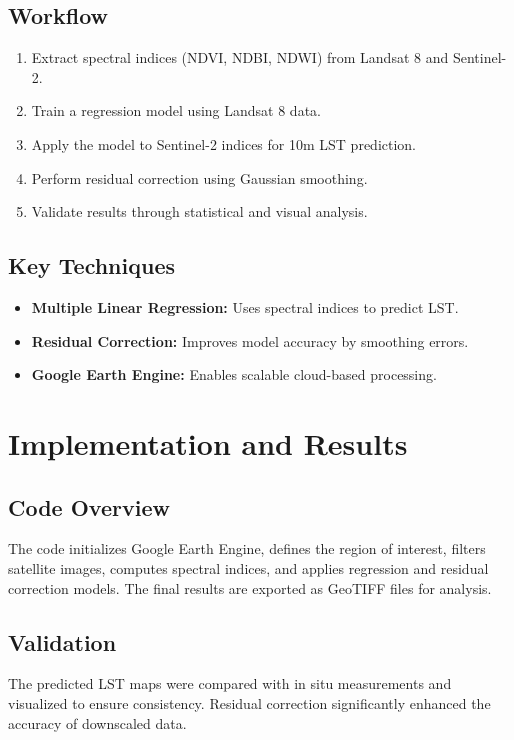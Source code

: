 \documentclass[runningheads,a4paper,11pt]{report}
\begin{document}
\section{Workflow}
\begin{enumerate}
    \item Extract spectral indices (NDVI, NDBI, NDWI) from Landsat 8 and Sentinel-2.
    \item Train a regression model using Landsat 8 data.
    \item Apply the model to Sentinel-2 indices for 10m LST prediction.
    \item Perform residual correction using Gaussian smoothing.
    \item Validate results through statistical and visual analysis.
\end{enumerate}

\section{Key Techniques}
\begin{itemize}
    \item \textbf{Multiple Linear Regression:} Uses spectral indices to predict LST.
    \item \textbf{Residual Correction:} Improves model accuracy by smoothing errors.
    \item \textbf{Google Earth Engine:} Enables scalable cloud-based processing.
\end{itemize}

\chapter{Implementation and Results}
\section{Code Overview}
The code initializes Google Earth Engine, defines the region of interest, filters satellite images, computes spectral indices, and applies regression and residual correction models. The final results are exported as GeoTIFF files for analysis.

\section{Validation}
The predicted LST maps were compared with in situ measurements and visualized to ensure consistency. Residual correction significantly enhanced the accuracy of downscaled data.
\end{document}
